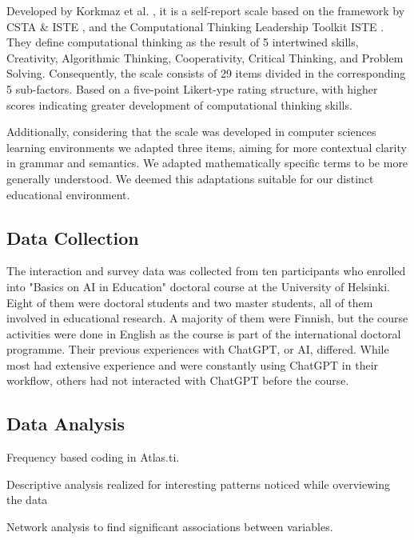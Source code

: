 \documentclass[sn-mathphys, Numbered]{sn-jnl}%
\theoremstyle{thmstyleone}%
\theoremstyle{thmstyletwo}%
\theoremstyle{thmstylethree}%
\begin{document}
Developed by Korkmaz et al. \parencite*{korkmaz_validity_2017-1}, it is a self-report scale based on the framework by CSTA \& ISTE \parencite*{csta_iste_operational_2015}, and the Computational Thinking Leadership Toolkit ISTE \parencite*{iste_computational_2011}. They define computational thinking as the result of 5 intertwined skills, Creativity, Algorithmic Thinking, Cooperativity, Critical Thinking, and Problem Solving. Consequently, the scale consists of 29 items divided in the corresponding 5 sub-factors. Based on a five-point Likert-ype rating structure, with higher scores indicating greater development of computational thinking skills. 

Additionally, considering that the scale was developed in computer sciences learning environments we adapted three items, aiming for more contextual clarity in grammar and semantics. We adapted mathematically specific terms to be more generally understood. We deemed this adaptations suitable for our distinct educational environment.


\subsection{Data Collection}

The interaction and survey data was collected from ten participants who enrolled into "Basics on AI in Education" doctoral course at the University of Helsinki. Eight of them were doctoral students and two master students, all of them involved in educational research. A majority of them were Finnish, but the course activities were done in English as the course is part of the international doctoral programme. Their previous experiences with ChatGPT, or AI, differed. While most had extensive experience and were constantly using ChatGPT in their workflow, others had not interacted with ChatGPT before the course.


\subsection{Data Analysis}

Frequency based coding in Atlas.ti. 

Descriptive analysis realized for interesting patterns noticed while overviewing the data

Network analysis to find significant associations between variables.
\end{document}
